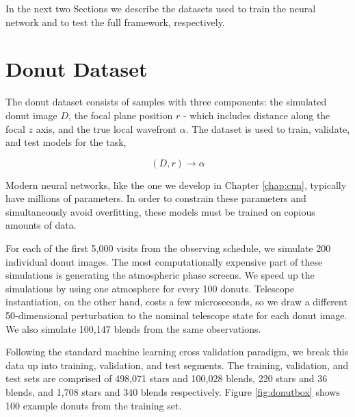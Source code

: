 In the next two Sections we describe the datasets used to train the neural network and to test the full framework, respectively.


\section{Donut Dataset}

The donut dataset consists of samples with three components: the simulated donut image $D$, the focal plane position $r$ - which includes distance along the focal $z$ axis, and the true local wavefront $\alpha$. The dataset is used to train, validate, and test models for the task,

\begin{equation}\label{eqn:blackbody}
(D,r) \to \alpha
\end{equation}

Modern neural networks, like the one we develop in Chapter \ref{chap:cnn}, typically have millions of parameters. In order to constrain these parameters and simultaneously avoid overfitting, these models must be trained on copious amounts of data. 

For each of the first 5,000 visits from the observing schedule, we simulate 200 individual donut images. The most computationally expensive part of these simulations is generating the atmospheric phase screens. We speed up the simulations by using one atmosphere for every 100 donuts. Telescope instantiation, on the other hand, costs a few microseconds, so we draw a different 50-dimensional perturbation to the nominal telescope state for each donut image. We also simulate 100,147 blends from the same observations. 

Following the standard machine learning cross validation paradigm, we break this data up into training, validation, and test segments. The training, validation, and test sets are comprised of 498,071 stars and 100,028 blends, 220 stars and 36 blends, and 1,708 stars and 340 blends respectively. Figure \ref{fig:donutbox} shows 100 example donuts from the training set. 

